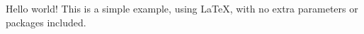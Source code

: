 \documentclass{article}
\begin{document}
Hello world! This is a simple example, using \LaTeX, with no extra parameters or packages included.
\end{document}
